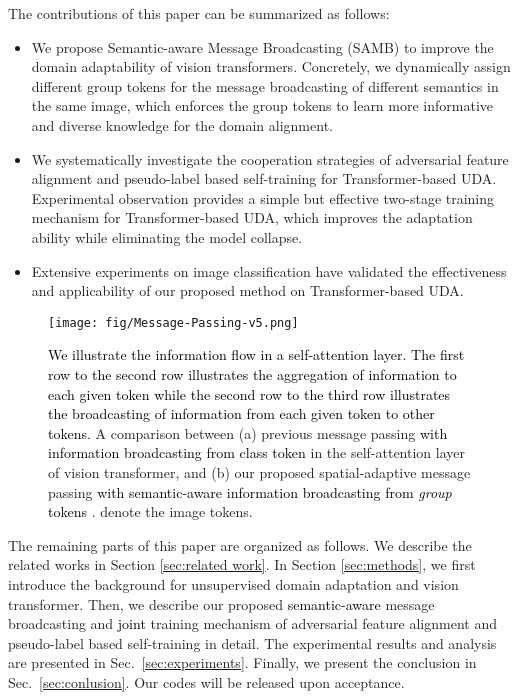 \documentclass[journal]{IEEEtran}
\newcommand{\tcb}{\textcolor{black}}
\begin{document}
 The contributions of this paper can be summarized as follows:
 \begin{itemize}
     \item We propose Semantic-aware Message Broadcasting (SAMB) to improve the domain adaptability of vision transformers. Concretely, we dynamically assign  different group tokens for the message broadcasting of different semantics in the same image, which enforces the group tokens to learn more informative and diverse knowledge for the domain alignment.  


     \item We systematically investigate the cooperation strategies of adversarial feature alignment and pseudo-label based self-training for Transformer-based UDA. Experimental observation provides a simple but effective two-stage training mechanism for Transformer-based UDA, which improves the adaptation ability while eliminating the model collapse. 

     \item Extensive experiments on image classification have validated the effectiveness and applicability of our proposed method on Transformer-based UDA. 
     
 \end{itemize}


    
\begin{figure*}
    \centering
    \texttt{[image: fig/Message-Passing-v5.png]}
    \caption{\tcb{We illustrate the information flow in a self-attention layer. The first row to the second row illustrates the aggregation of information to each given token while the second row to the third row illustrates the broadcasting of information from each given token to other tokens.} A comparison between (a) previous message passing \tcb{with information broadcasting from class token } in the self-attention layer of vision transformer, and (b) our proposed spatial-adaptive message passing \tcb{with semantic-aware information broadcasting from \emph{group} tokens }.  denote the image tokens.} \label{fig:concept_comparion}
\end{figure*}


The remaining parts of this paper are organized as follows. We describe the related works in Section \ref{sec:related work}. In Section \ref{sec:methods}, we first introduce the background for unsupervised domain adaptation and vision transformer. Then, we describe our proposed \tcb{semantic-aware} message broadcasting and \tcb{joint} training mechanism {of adversarial feature alignment and pseudo-label based self-training} in detail. The experimental results and analysis are presented in Sec.~\ref{sec:experiments}. Finally, we present the conclusion in Sec.~\ref{sec:conlusion}.
Our codes will be released upon acceptance. 
\end{document}
